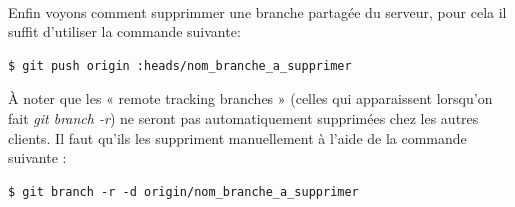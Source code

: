 \documentclass[french, a4paper, 12pt, titlepage]{article}
\begin{document}
\paragraph{}Enfin voyons comment supprimmer une branche partagée du serveur, pour cela il suffit d'utiliser la commande suivante:
\begin{lstlisting}
$ git push origin :heads/nom_branche_a_supprimer
\end{lstlisting}
À noter que les « remote tracking branches » (celles qui apparaissent lorsqu’on fait  \emph{git branch -r}) ne seront pas automatiquement supprimées chez les autres clients. Il faut qu’ils les suppriment manuellement à l’aide de la commande suivante :
\begin{lstlisting}
$ git branch -r -d origin/nom_branche_a_supprimer
\end{lstlisting}



%
%
\end{document}
